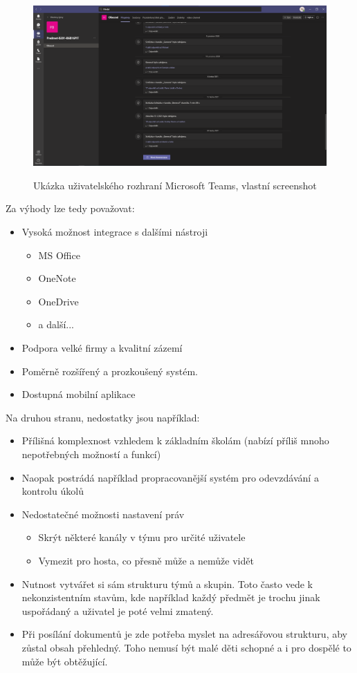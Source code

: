 \begin{figure}[H]
    \caption{Ukázka uživatelského rozhraní Microsoft Teams, vlastní screenshot}
    \centering
    \includegraphics[width=\textwidth]{images/teams}
    \label{img:teams}
\end{figure}

Za výhody lze tedy považovat:
\begin{itemize}
  \item Vysoká možnost integrace s dalšími nástroji
  \begin{itemize}
    \item MS Office
    \item OneNote
    \item OneDrive
    \item a další...
  \end{itemize}
  \item Podpora velké firmy a kvalitní zázemí
  \item Poměrně rozšířený a prozkoušený systém.
  \item Dostupná mobilní aplikace
\end{itemize}

Na druhou stranu, nedostatky jsou například:
\begin{itemize}
  \item Přílišná komplexnost vzhledem k základním školám (nabízí příliš mnoho nepotřebných možností a funkcí)
  \item Naopak postrádá například propracovanější systém pro odevzdávání a kontrolu úkolů
  \item Nedostatečné možnosti nastavení práv
    \begin{itemize}
    \item Skrýt některé kanály v týmu pro určité uživatele
    \item Vymezit pro hosta, co přesně může a nemůže vidět
  \end{itemize}
  \item Nutnost vytvářet si sám strukturu týmů a skupin. Toto často vede k nekonzistentním stavům, kde například každý předmět je trochu jinak uspořádaný a uživatel je poté velmi zmatený.
  \item Při posílání dokumentů je zde potřeba myslet na adresářovou strukturu, aby zůstal obsah přehledný. Toho nemusí být malé děti schopné a i pro dospělé to může být obtěžující.
\end{itemize}


